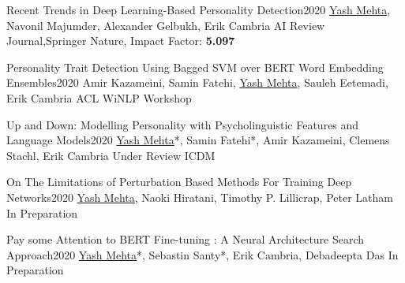 
%
%
%

\begin{projects}
	\project
	{Recent Trends in Deep Learning-Based Personality Detection}{2020}
	{\underline{Yash Mehta}, Navonil Majumder, Alexander Gelbukh, Erik Cambria}
	{}
	{AI Review Journal,Springer Nature, Impact Factor: \textbf{5.097}}

	\project
	{Personality Trait Detection Using Bagged SVM over BERT Word Embedding Ensembles}{2020}
	{Amir Kazameini,  Samin Fatehi, \underline{Yash Mehta}, Sauleh Eetemadi, Erik Cambria}
	{}
	{ACL WiNLP Workshop}
	
	\project
	{Up and Down: Modelling Personality with Psycholinguistic Features and Language Models}{2020}
	{\underline{Yash Mehta}*, Samin Fatehi*, Amir Kazameini, Clemens Stachl, Erik Cambria}
	{}
	{Under Review ICDM}
	
	\project
	{On The Limitations of Perturbation Based Methods For Training Deep Networks}{2020}
	{\underline{Yash Mehta}, Naoki Hiratani, Timothy P. Lillicrap, Peter Latham}
	{}
	{In Preparation}
	
	\project
	{Pay some Attention to BERT Fine-tuning : A Neural Architecture Search Approach}{2020}
	{\underline{Yash Mehta}*, Sebastin Santy*, Erik Cambria, Debadeepta Das}
	{}
	{In Preparation}
	
\end{projects}